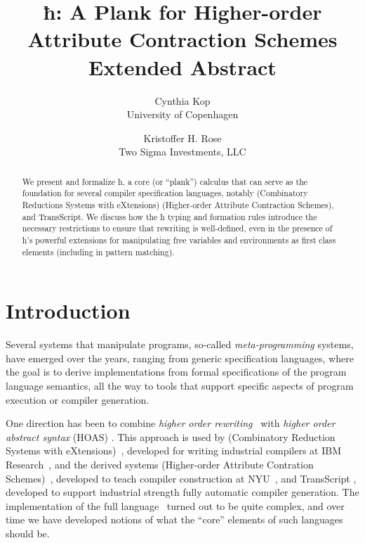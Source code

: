 \documentclass[letterpaper,10pt]{proc}
\title{ ħ: A Plank for Higher-order Attribute Contraction Schemes \\ Extended Abstract }
\author{%
  Cynthia Kop \\
  University of Copenhagen
  \and
  Kristoffer H. Rose \\
  Two Sigma Investments, LLC
}
\begin{document}
\maketitle

\begin{abstract}\noindent
  We present and formalize ħ, a core (or ``plank'') calculus that can serve as the foundation
  for several compiler specification languages, notably \CRSX (Combinatory Reductions Systems with
  eXtensions) \HAX (Higher-order Attribute Contraction Schemes), and \textsf{TransScript}.
  We discuss how the ħ typing and formation rules introduce the necessary restrictions to
  ensure that rewriting is well-defined, even in the presence of ħ's powerful extensions for
  manipulating free variables and environments as first class elements (including in pattern
  matching).
\end{abstract}


\section{Introduction}\label{sec:intro}

Several systems that manipulate programs, so-called \emph{meta-programming} systems, have emerged
over the years, ranging from generic specification languages, where the goal is to derive
implementations from formal specifications of the program language semantics, all the way to tools
that support specific aspects of program execution or compiler generation.

One direction has been to combine \emph{higher order rewriting}~\cite{Jouannaud:klop2005} with
\emph{higher order abstract syntax} (HOAS) \cite{PfenningElliot:pldi1988}. This approach is used by
\CRSX (Combinatory Reduction Systems with eXtensions)~\cite{Rose:1996}, developed for writing
industrial compilers at IBM Research~\cite{Rose:hor2010,Rose:rta2011,dp60:ibm2013}, and the derived
systems \HAX (Higher-order Attribute Contration Schemes)~\cite{Rose:ts2015}, developed to teach
compiler construction at NYU~\cite{RoseRose:cims2015}, and \textsf{TransScript} \cite{}, developed
to support industrial strength fully automatic compiler generation.  The implementation of the full
\CRSX language~\cite{crsx} turned out to be quite complex, and over time we have developed notions
of what the ``core'' elements of such languages should be.
\end{document}
